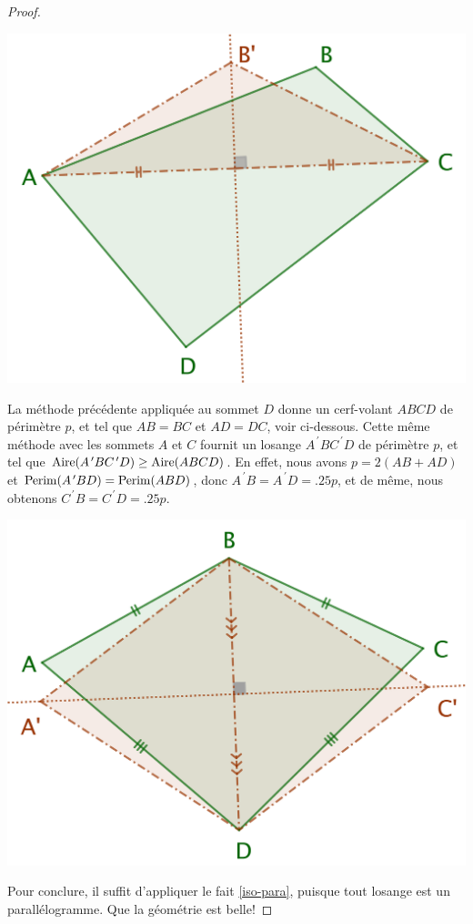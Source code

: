 \begin{proof}
	\begin{center}
		\includegraphics[scale=.4]{content/quadrilateral/quadrilateral-convex-gene.png}
	\end{center}
	
	
	La méthode précédente appliquée au sommet $D$ donne un cerf-volant $ABCD$ de périmètre $p$, et tel que $AB = BC$ et $AD = DC$, voir ci-dessous. 
	Cette même méthode avec les sommets $A$ et $C$ fournit un losange $A^{\,\prime}BC^{\,\prime}D$ de périmètre $p$, et tel que $\mathrm{Aire}(A^{\,\prime}BC^{\,\prime}D) \geq \mathrm{Aire}(ABCD)$.
	En effet, nous avons
	$p = 2(AB + AD)$
	et
	$\mathrm{Perim}(A^{\,\prime}BD) = \mathrm{Perim}(ABD)$,
	donc
	$A^{\,\prime}B = A^{\,\prime}D = \num{.25} p$,
	et de même, nous obtenons
	$C^{\,\prime}B = C^{\,\prime}D = \num{.25} p$.

	\begin{center}
		\includegraphics[scale=.4]{content/quadrilateral/quadrilateral-convex-isopaire.png}
	\end{center}
	
	
	Pour conclure, il suffit d'appliquer le fait \ref{iso-para}, puisque tout losange est un parallélogramme. Que la géométrie est belle!
\end{proof}

